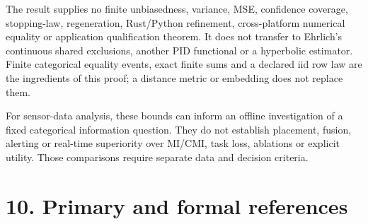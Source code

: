 \documentclass[11pt,a4paper]{article}
\begin{document}
The result supplies no finite unbiasedness, variance, MSE, confidence coverage, stopping-law, regeneration, Rust/Python refinement, cross-platform numerical equality or application qualification theorem. It does not transfer to Ehrlich's continuous shared exclusions, another PID functional or a hyperbolic estimator. Finite categorical equality events, exact finite sums and a declared iid row law are the ingredients of this proof; a distance metric or embedding does not replace them.

For sensor-data analysis, these bounds can inform an offline investigation of a fixed categorical information question. They do not establish placement, fusion, alerting or real-time superiority over MI/CMI, task loss, ablations or explicit utility. Those comparisons require separate data and decision criteria.

\section{10. Primary and formal references}\label{primary-and-formal-references}
\end{document}
